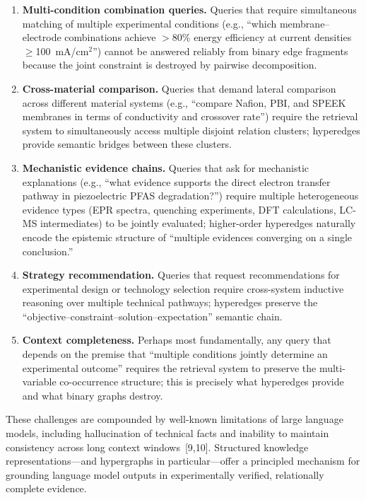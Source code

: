 \documentclass[11pt,a4paper]{article}
\begin{document}
\begin{enumerate}
\item \textbf{Multi-condition combination queries.} Queries that require simultaneous matching of multiple experimental conditions (e.g., ``which membrane--electrode combinations achieve $>$80\% energy efficiency at current densities $\geq$100~mA/cm$^2$'') cannot be answered reliably from binary edge fragments because the joint constraint is destroyed by pairwise decomposition.
\item \textbf{Cross-material comparison.} Queries that demand lateral comparison across different material systems (e.g., ``compare Nafion, PBI, and SPEEK membranes in terms of conductivity and crossover rate'') require the retrieval system to simultaneously access multiple disjoint relation clusters; hyperedges provide semantic bridges between these clusters.
\item \textbf{Mechanistic evidence chains.} Queries that ask for mechanistic explanations (e.g., ``what evidence supports the direct electron transfer pathway in piezoelectric PFAS degradation?'') require multiple heterogeneous evidence types (EPR spectra, quenching experiments, DFT calculations, LC-MS intermediates) to be jointly evaluated; higher-order hyperedges naturally encode the epistemic structure of ``multiple evidences converging on a single conclusion.''
\item \textbf{Strategy recommendation.} Queries that request recommendations for experimental design or technology selection require cross-system inductive reasoning over multiple technical pathways; hyperedges preserve the ``objective--constraint--solution--expectation'' semantic chain.
\item \textbf{Context completeness.} Perhaps most fundamentally, any query that depends on the premise that ``multiple conditions jointly determine an experimental outcome'' requires the retrieval system to preserve the multi-variable co-occurrence structure; this is precisely what hyperedges provide and what binary graphs destroy.
\end{enumerate}

These challenges are compounded by well-known limitations of large language models, including hallucination of technical facts and inability to maintain consistency across long context windows~[9,10]. Structured knowledge representations---and hypergraphs in particular---offer a principled mechanism for grounding language model outputs in experimentally verified, relationally complete evidence.
\end{document}
